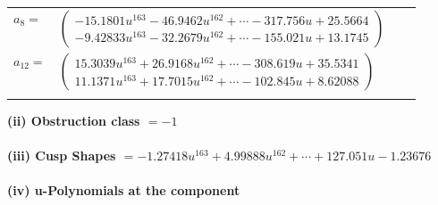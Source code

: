 \documentclass[1p]{elsarticle_modified}
\theoremstyle{definition}
\begin{document}
\begin{tabular}{m{7pt} m{180pt} m{7pt} m{180pt} }
\flushright $a_{8}=$&$\begin{pmatrix}-15.1801 u^{163}-46.9462 u^{162}+\cdots-317.756 u+25.5664\\-9.42833 u^{163}-32.2679 u^{162}+\cdots-155.021 u+13.1745\end{pmatrix}$ \\
\flushright $a_{12}=$&$\begin{pmatrix}15.3039 u^{163}+26.9168 u^{162}+\cdots-308.619 u+35.5341\\11.1371 u^{163}+17.7015 u^{162}+\cdots-102.845 u+8.62088\end{pmatrix}$\\&\end{tabular}
\flushleft \textbf{(ii) Obstruction class $= -1$}\\~\\
\flushleft \textbf{(iii) Cusp Shapes $= -1.27418 u^{163}+4.99888 u^{162}+\cdots+127.051 u-1.23676$}\\~\\
\newpage\renewcommand{\arraystretch}{1}
\flushleft \textbf{(iv) u-Polynomials at the component}\newline \\
\end{document}
